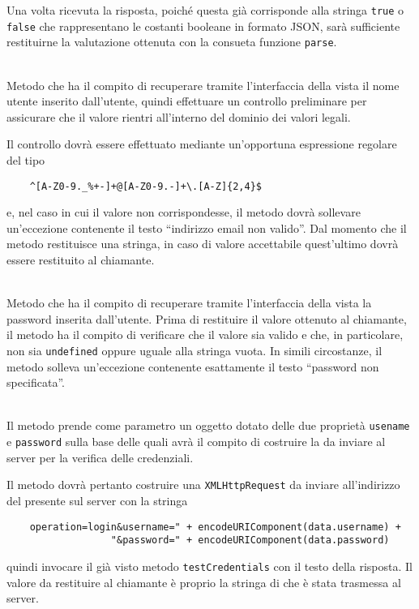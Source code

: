 \begin{description}
Una volta ricevuta la risposta, poiché questa già corrisponde alla stringa \verb+true+ o \verb+false+ che rappresentano le costanti booleane in formato JSON, sarà sufficiente restituirne la valutazione ottenuta con la consueta funzione \verb+parse+.

\item{}\\
Metodo che ha il compito di recuperare tramite l'interfaccia della vista il nome utente inserito dall'utente, quindi effettuare un controllo preliminare per assicurare che il valore rientri all'interno del dominio dei valori legali.

Il controllo dovrà essere effettuato mediante un'opportuna espressione regolare del tipo
\begin{verbatim}
    ^[A-Z0-9._%+-]+@[A-Z0-9.-]+\.[A-Z]{2,4}$
\end{verbatim}
e, nel caso in cui il valore non corrispondesse, il metodo dovrà sollevare un'eccezione contenente il testo ``indirizzo email non valido''. Dal momento che il metodo restituisce una stringa, in caso di valore accettabile quest'ultimo dovrà essere restituito al chiamante.

\item{}\\
Metodo che ha il compito di recuperare tramite l'interfaccia della vista la password inserita dall'utente. Prima di restituire il valore ottenuto al chiamante, il metodo ha il compito di verificare che il valore sia valido e che, in particolare, non sia \verb+undefined+ oppure uguale alla stringa vuota. In simili circostanze, il metodo solleva un'eccezione contenente esattamente il testo ``password non specificata''.

\item{}\\
Il metodo prende come parametro un oggetto dotato delle due proprietà \verb+usename+ e \verb+password+ sulla base delle quali avrà il compito di costruire la  da inviare al server per la verifica delle credenziali.

Il metodo dovrà pertanto costruire una \verb+XMLHttpRequest+ da inviare all'indirizzo del  presente sul server con la stringa
\begin{verbatim}
    operation=login&username=" + encodeURIComponent(data.username) +
                  "&password=" + encodeURIComponent(data.password)
\end{verbatim}
quindi invocare il già visto metodo \verb+testCredentials+ con il testo della risposta. Il valore da restituire al chiamante è proprio la stringa di  che è stata trasmessa al server.


\end{description}
